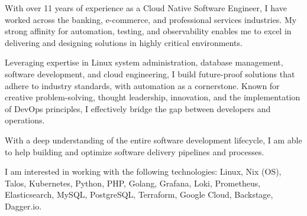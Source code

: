 
\begin{cvparagraph}
With over 11 years of experience as a Cloud Native Software Engineer, I have worked across the banking, e-commerce, and professional services industries. 
My strong affinity for automation, testing, and observability enables me to excel in delivering and designing solutions in highly critical environments. 

Leveraging expertise in Linux system administration, database management, software development, and cloud engineering, 
I build future-proof solutions that adhere to industry standards, with automation as a cornerstone. Known for creative problem-solving, thought leadership, innovation, and the implementation of DevOps principles, I effectively bridge the gap between developers and operations. 

With a deep understanding of the entire software development lifecycle, I am able to help building and optimize software delivery pipelines and processes.

I am interested in working with the following technologies: Linux, Nix (OS), Talos, Kubernetes, Python, PHP, Golang, Grafana, Loki, Prometheus, Elasticsearch,
 MySQL, PostgreSQL, Terraform, Google Cloud, Backstage, Dagger.io.


\end{cvparagraph}

